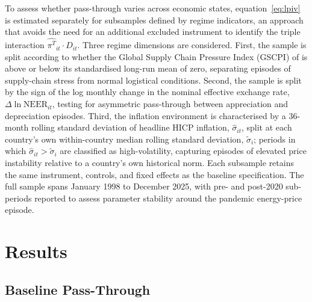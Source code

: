 To assess whether pass-through varies across economic states, equation~\eqref{eq:lpiv}
is estimated separately for subsamples defined by regime indicators, an approach that
avoids the need for an additional excluded instrument to identify the triple interaction
$\widehat{\pi^T}_{it} \cdot D_{it}$.
Three regime dimensions are considered.
First, the sample is split according to whether the Global Supply Chain Pressure Index
(GSCPI) of \citet{benigno2022} is above or below its standardised long-run mean of zero,
separating episodes of supply-chain stress from normal logistical conditions.
Second, the sample is split by the sign of the log monthly change in the nominal effective
exchange rate, $\Delta\ln\mathrm{NEER}_{it}$, testing for asymmetric pass-through between
appreciation and depreciation episodes.
Third, the inflation environment is characterised by a 36-month rolling standard deviation
of headline HICP inflation, $\hat{\sigma}_{it}$, split at each country's own within-country
median rolling standard deviation, $\tilde{\sigma}_i$; periods in which
$\hat{\sigma}_{it} > \tilde{\sigma}_i$ are classified as high-volatility, capturing episodes
of elevated price instability relative to a country's own historical norm.
Each subsample retains the same instrument, controls, and fixed effects as the baseline
specification.
The full sample spans January 1998 to December 2025, with pre- and post-2020 sub-periods
reported to assess parameter stability around the pandemic energy-price episode.

\section{Results}\label{sec:results}

\subsection{Baseline Pass-Through}

